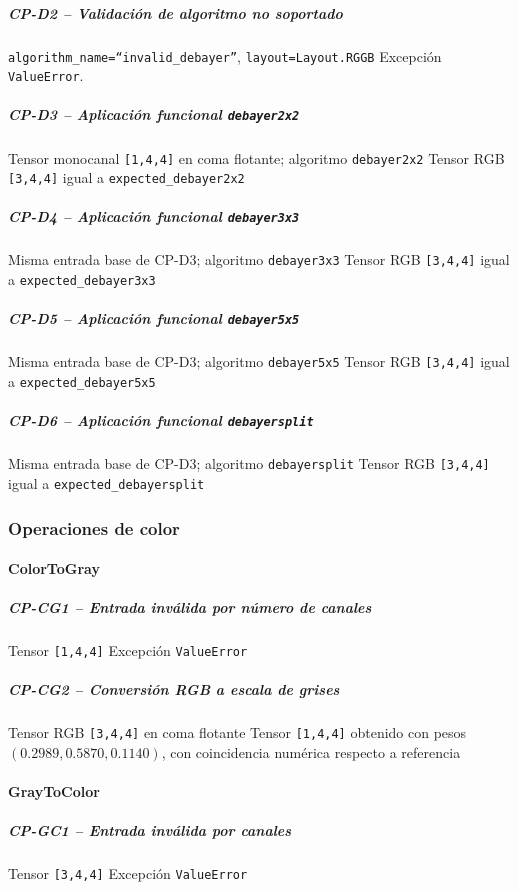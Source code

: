 \subparagraph{CP-D2 -- Validación de algoritmo no soportado}\label{cp:CP-D2}
\testcasetable
{\texttt{algorithm\_name=``invalid\_debayer''}, \texttt{layout=Layout.RGGB}}
{Excepción \texttt{ValueError}.}

\subparagraph{CP-D3 -- Aplicación funcional \texttt{debayer2x2}}\label{cp:CP-D3}
\testcasetable
{Tensor monocanal \texttt{[1,4,4]} en coma flotante; algoritmo \texttt{debayer2x2}}
{Tensor RGB \texttt{[3,4,4]} igual a \texttt{expected\_debayer2x2}}

\subparagraph{CP-D4 -- Aplicación funcional \texttt{debayer3x3}}\label{cp:CP-D4}
\testcasetable
{Misma entrada base de CP-D3; algoritmo \texttt{debayer3x3}}
{Tensor RGB \texttt{[3,4,4]} igual a \texttt{expected\_debayer3x3}}

\subparagraph{CP-D5 -- Aplicación funcional \texttt{debayer5x5}}\label{cp:CP-D5}
\testcasetable
{Misma entrada base de CP-D3; algoritmo \texttt{debayer5x5}}
{Tensor RGB \texttt{[3,4,4]} igual a \texttt{expected\_debayer5x5}}

\subparagraph{CP-D6 -- Aplicación funcional \texttt{debayersplit}}\label{cp:CP-D6}
\testcasetable
{Misma entrada base de CP-D3; algoritmo \texttt{debayersplit}}
{Tensor RGB \texttt{[3,4,4]} igual a \texttt{expected\_debayersplit}}

\subsubsection{Operaciones de color} \label{subsubsec:8_2_2_color}

\paragraph{ColorToGray}
\subparagraph{CP-CG1 -- Entrada inválida por número de canales}\label{cp:CP-CG1}
\testcasetable
{Tensor \texttt{[1,4,4]}}
{Excepción \texttt{ValueError}}

\subparagraph{CP-CG2 -- Conversión RGB a escala de grises}\label{cp:CP-CG2}
\testcasetable
{Tensor RGB \texttt{[3,4,4]} en coma flotante}
{Tensor \texttt{[1,4,4]} obtenido con pesos $(0.2989, 0.5870, 0.1140)$, con coincidencia numérica respecto a referencia}

\paragraph{GrayToColor}
\subparagraph{CP-GC1 -- Entrada inválida por canales}\label{cp:CP-GC1}
\testcasetable
{Tensor \texttt{[3,4,4]}}
{Excepción \texttt{ValueError}}

